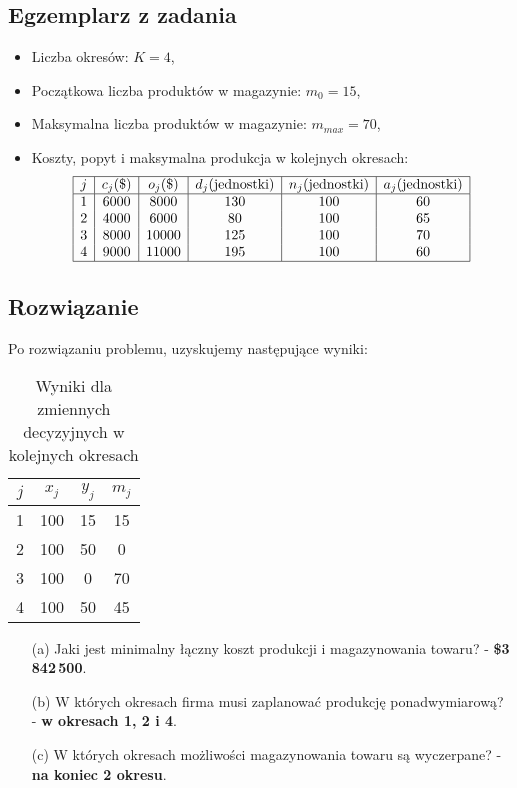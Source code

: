 \documentclass{article}
\begin{document}
\subsection{Egzemplarz z zadania}
\begin{itemize}
    \item Liczba okresów: \( K = 4 \),
    \item Początkowa liczba produktów w magazynie: \( m_0 = 15 \),
    \item Maksymalna liczba produktów w magazynie: \( m_{max} = 70 \),
    \item Koszty, popyt i maksymalna produkcja w kolejnych okresach:
    \[
    \begin{array}{|c|c|c|c|c|c|}
    \hline
    j & c_j (\$) & o_j (\$) & d_j (\text{jednostki}) & n_j (\text{jednostki}) & a_j (\text{jednostki})\\
    \hline
    1 & 6000 & 8000 & 130 & 100 & 60\\
    2 & 4000 & 6000 & 80 & 100 & 65\\
    3 & 8000 & 10000 & 125 & 100 & 70\\
    4 & 9000 & 11000 & 195 & 100 & 60\\
    \hline
    \end{array}
    \]
\end{itemize}


\subsection{Rozwiązanie}
Po rozwiązaniu problemu, uzyskujemy następujące wyniki:

\begin{table}[h!]
    \centering
    \begin{tabular}{|c|c|c|c|}
        \hline
        $j$ & $x_j$ & $y_j$ & $m_j$ \\
        \hline
        1 & 100 & 15 & 15 \\
        2 & 100 & 50 & 0 \\
        3 & 100 & 0 & 70 \\
        4 & 100 & 50 & 45 \\
        \hline
    \end{tabular}
    \caption{Wyniki dla zmiennych decyzyjnych w kolejnych okresach}
\end{table}


\begin{itemize}
    \item[(a)] Jaki jest minimalny łączny koszt produkcji i magazynowania towaru? - \textbf{\$3\,842\,500}.

    \item[(b)] W których okresach firma musi zaplanować produkcję ponadwymiarową? - \textbf{w okresach 1, 2 i 4}.

    \item[(c)] W których okresach możliwości magazynowania towaru są wyczerpane? - \textbf{na koniec 2 okresu}.
\end{itemize}
\end{document}
